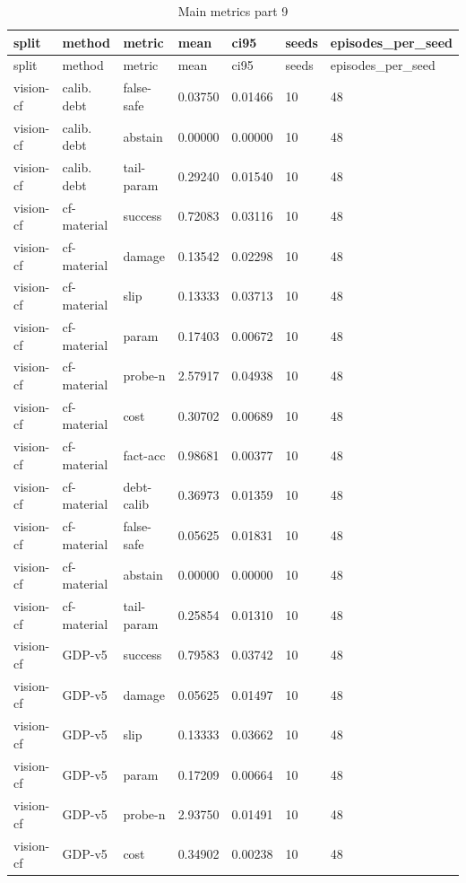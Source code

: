 \documentclass{article}
\begin{document}
\begin{center}
\tiny
\renewcommand{\arraystretch}{0.92}
\setlength{\tabcolsep}{3pt}
\begin{longtable}{lllllll}
\caption{Main metrics part 9}\label{tab:main-metrics-9}\\
\toprule
split & method & metric & mean & ci95 & seeds & episodes\_per\_seed \\
\midrule
\endfirsthead
\toprule
split & method & metric & mean & ci95 & seeds & episodes\_per\_seed \\
\midrule
\endhead
vision-cf & calib. debt & false-safe & 0.03750 & 0.01466 & 10 & 48 \\
vision-cf & calib. debt & abstain & 0.00000 & 0.00000 & 10 & 48 \\
vision-cf & calib. debt & tail-param & 0.29240 & 0.01540 & 10 & 48 \\
vision-cf & cf-material & success & 0.72083 & 0.03116 & 10 & 48 \\
vision-cf & cf-material & damage & 0.13542 & 0.02298 & 10 & 48 \\
vision-cf & cf-material & slip & 0.13333 & 0.03713 & 10 & 48 \\
vision-cf & cf-material & param & 0.17403 & 0.00672 & 10 & 48 \\
vision-cf & cf-material & probe-n & 2.57917 & 0.04938 & 10 & 48 \\
vision-cf & cf-material & cost & 0.30702 & 0.00689 & 10 & 48 \\
vision-cf & cf-material & fact-acc & 0.98681 & 0.00377 & 10 & 48 \\
vision-cf & cf-material & debt-calib & 0.36973 & 0.01359 & 10 & 48 \\
vision-cf & cf-material & false-safe & 0.05625 & 0.01831 & 10 & 48 \\
vision-cf & cf-material & abstain & 0.00000 & 0.00000 & 10 & 48 \\
vision-cf & cf-material & tail-param & 0.25854 & 0.01310 & 10 & 48 \\
vision-cf & GDP-v5 & success & 0.79583 & 0.03742 & 10 & 48 \\
vision-cf & GDP-v5 & damage & 0.05625 & 0.01497 & 10 & 48 \\
vision-cf & GDP-v5 & slip & 0.13333 & 0.03662 & 10 & 48 \\
vision-cf & GDP-v5 & param & 0.17209 & 0.00664 & 10 & 48 \\
vision-cf & GDP-v5 & probe-n & 2.93750 & 0.01491 & 10 & 48 \\
vision-cf & GDP-v5 & cost & 0.34902 & 0.00238 & 10 & 48 \\

\end{longtable}
\end{center}
\end{document}
